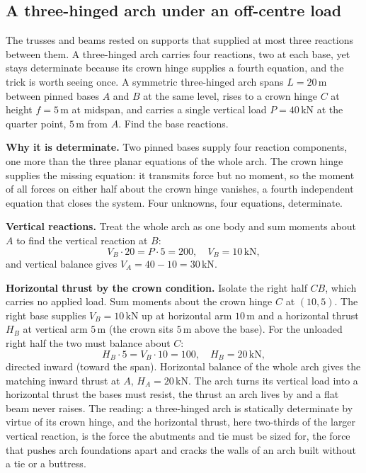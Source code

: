 \subsection{A three-hinged arch under an off-centre load}

The trusses and beams rested on supports that supplied at most three
reactions between them. A three-hinged arch carries four reactions, two
at each base, yet stays determinate because its crown hinge supplies a
fourth equation, and the trick is worth seeing once. A symmetric
three-hinged arch spans $L = 20\,\si{\meter}$ between pinned bases $A$ and
$B$ at the same level, rises to a crown hinge $C$ at height
$f = 5\,\si{\meter}$ at midspan, and carries a single vertical load
$P = 40\,\text{kN}$ at the quarter point, $5\,\si{\meter}$ from $A$. Find
the base reactions.

\textbf{Why it is determinate.} Two pinned bases supply four reaction
components, one more than the three planar equations of the whole arch.
The crown hinge supplies the missing equation: it transmits force but no
moment, so the moment of all forces on either half about the crown hinge
vanishes, a fourth independent equation that closes the system. Four
unknowns, four equations, determinate.

\textbf{Vertical reactions.} Treat the whole arch as one body and sum
moments about $A$ to find the vertical reaction at $B$:
\[
V_B\cdot 20 = P\cdot 5 = 200, \quad V_B = 10\,\text{kN},
\]
and vertical balance gives $V_A = 40 - 10 = 30\,\text{kN}$.

\textbf{Horizontal thrust by the crown condition.} Isolate the right
half $CB$, which carries no applied load. Sum moments about the crown
hinge $C$ at $(10, 5)$. The right base supplies $V_B = 10\,\text{kN}$ up
at horizontal arm $10\,\si{\meter}$ and a horizontal thrust $H_B$ at
vertical arm $5\,\si{\meter}$ (the crown sits $5\,\si{\meter}$ above the
base). For the unloaded right half the two must balance about $C$:
\[
H_B\cdot 5 = V_B\cdot 10 = 100, \quad H_B = 20\,\text{kN},
\]
directed inward (toward the span). Horizontal balance of the whole arch
gives the matching inward thrust at $A$, $H_A = 20\,\text{kN}$. The arch
turns its vertical load into a horizontal thrust the bases must resist,
the thrust an arch lives by and a flat beam never raises. The reading: a
three-hinged arch is statically determinate by virtue of its crown hinge,
and the horizontal thrust, here two-thirds of the larger vertical reaction, is the
force the abutments and tie must be sized for, the force that pushes
arch foundations apart and cracks the walls of an arch built without a
tie or a buttress.

